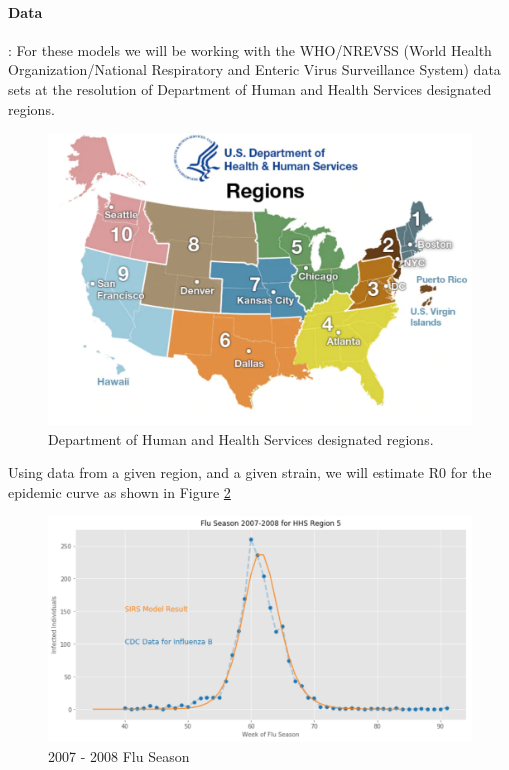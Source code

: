 \documentclass[11pt]{article}
\begin{document}
\paragraph{Data}: For these models we will be working with the WHO/NREVSS (World Health Organization/National Respiratory and Enteric Virus Surveillance System) data sets at the resolution of Department of Human and Health Services designated regions.

\begin{figure}
\includegraphics[width=\textwidth]{figs/regionsmap.pdf}
\caption{Department of Human and Health Services designated regions.}
\label{Fig:Regions}
\end{figure}

Using data from a given region, and a given strain, we will estimate R0 for the epidemic curve as shown in Figure \ref{Fig:R0}

\begin{figure}
\includegraphics[width=\textwidth]{figs/2007-2008-SIRS.pdf}
\caption{2007 - 2008 Flu Season}
\label{Fig:R0}
\end{figure}
\end{document}
